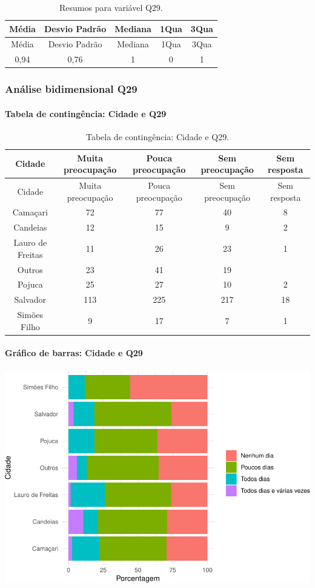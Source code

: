 \documentclass[]{article}
\let\oldparagraph\paragraph
\renewcommand{\paragraph}[1]{\oldparagraph{#1}\mbox{}}
\begin{document}
\begin{longtable}[]{@{}ccccc@{}}
\caption{\label{tab:unnamed-chunk-897}Resumos para variável Q29.}\tabularnewline
\toprule
Média & Desvio Padrão & Mediana & 1Qua & 3Qua\tabularnewline
\midrule
\endfirsthead
\toprule
Média & Desvio Padrão & Mediana & 1Qua & 3Qua\tabularnewline
\midrule
\endhead
0,94 & 0,76 & 1 & 0 & 1\tabularnewline
\bottomrule
\end{longtable}

\cleardoublepage

\hypertarget{anuxe1lise-bidimensional-q29}{%
\subsubsection{Análise bidimensional Q29}\label{anuxe1lise-bidimensional-q29}}

\hypertarget{tabela-de-continguxeancia-cidade-e-q29}{%
\paragraph{Tabela de contingência: Cidade e Q29}\label{tabela-de-continguxeancia-cidade-e-q29}}

\begin{longtable}[]{@{}ccccc@{}}
\caption{\label{tab:unnamed-chunk-898}Tabela de contingência: Cidade e Q29.}\tabularnewline
\toprule
Cidade & Muita preocupação & Pouca preocupação & Sem preocupação & Sem resposta\tabularnewline
\midrule
\endfirsthead
\toprule
Cidade & Muita preocupação & Pouca preocupação & Sem preocupação & Sem resposta\tabularnewline
\midrule
\endhead
Camaçari & 72 & 77 & 40 & 8\tabularnewline
Candeias & 12 & 15 & 9 & 2\tabularnewline
Lauro de Freitas & 11 & 26 & 23 & 1\tabularnewline
Outros & 23 & 41 & 19 &\tabularnewline
Pojuca & 25 & 27 & 10 & 2\tabularnewline
Salvador & 113 & 225 & 217 & 18\tabularnewline
Simões Filho & 9 & 17 & 7 & 1\tabularnewline
\bottomrule
\end{longtable}

\hypertarget{gruxe1fico-de-barras-cidade-e-q29}{%
\paragraph{Gráfico de barras: Cidade e Q29}\label{gruxe1fico-de-barras-cidade-e-q29}}

\begin{center}\includegraphics[width=0.75\linewidth]{relatorio_covid19_files/figure-latex/unnamed-chunk-899-1} \end{center}
\end{document}
